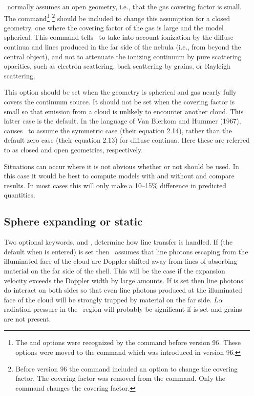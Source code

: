 \Cloudy\ normally assumes an open geometry, i.e.,
that the gas covering factor is small.
The  command\footnote{The  and 
options were recognized by the  command before
version 96.  These options were moved to the  command which was
introduced in version 96.} \footnote{Before version 96 the  command included an option to change
the covering factor.  The covering factor was removed from the
command.  Only the  command changes the covering
factor.} should be included
to change this assumption for a closed geometry,
one where the covering factor of the gas is large and the model spherical.
This command tells \Cloudy\ to take into account ionization by the diffuse
continua and lines produced in the far side of the nebula
(i.e., from beyond the central object), and not to attenuate
the ionizing continuum by pure
scattering opacities, such as electron scattering,
back scattering by grains,
or Rayleigh scattering.

This option should be set when the geometry is spherical and gas nearly
fully covers the continuum source.
It should not be set when the covering
factor is small so that emission from a cloud is unlikely to encounter
another cloud.
This latter case is the default.
In the language of Van
Blerkom and Hummer (1967), 
causes \Cloudy\ to assume the symmetric
case (their equation 2.14),
rather than the default zero case (their equation
2.13) for diffuse continua.
Here these are referred to as closed and open
geometries, respectively.

Situations can occur where it is not obvious whether or not
 should
be used.
In this case it would be best to compute models with and without
 and compare results.
In most cases this will only make a 10--15\%
difference in predicted quantities.

\subsection{Sphere expanding or static}

Two optional keywords,
 and ,
determine how line transfer
is handled.
If  (the default when
 is entered) is set then
\Cloudy\ assumes that line photons escaping
from the illuminated face of the
cloud are Doppler shifted away from lines of
absorbing material on the far
side of the shell.
This will be the case if the expansion velocity exceeds
the Doppler width by large amounts.
If  is set then line photons
do interact on both sides so that even line photons produced at the
illuminated face of the cloud will be strongly trapped by material on the
far side.
$L\alpha $ radiation pressure in the \hplus\ region will probably be
significant if  is set and grains are not present.

